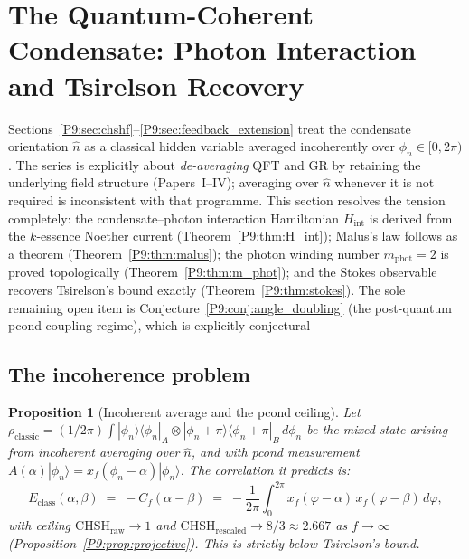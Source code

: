 \documentclass[11pt,a4paper]{article}
\newtheorem{proposition}[theorem]{Proposition}
\theoremstyle{definition}
\theoremstyle{remark}
\newcommand{\CHSH}{\mathrm{CHSH}}
\begin{document}
\section{The Quantum-Coherent Condensate: Photon Interaction and Tsirelson Recovery}
\label{P9:sec:quantum_coherent}
 
Sections~\ref{P9:sec:chshf}--\ref{P9:sec:feedback_extension} treat the condensate
orientation $\hat{n}$ as a classical hidden variable averaged incoherently
over $\phi_n\in[0,2\pi)$.
The series is explicitly about \emph{de-averaging} QFT and GR by retaining
the underlying field structure (Papers~I--IV); averaging over $\hat{n}$
whenever it is not required is inconsistent with that programme.
This section resolves the tension completely:
the condensate--photon interaction Hamiltonian $H_\mathrm{int}$ is derived from
the $k$-essence Noether current (Theorem~\ref{P9:thm:H_int});
Malus's law follows as a theorem (Theorem~\ref{P9:thm:malus});
the photon winding number $m_\mathrm{phot}=2$ is proved topologically
(Theorem~\ref{P9:thm:m_phot}); and the Stokes observable recovers
Tsirelson's bound exactly (Theorem~\ref{P9:thm:stokes}).
The sole remaining open item is Conjecture~\ref{P9:conj:angle_doubling}
(the post-quantum pcond coupling regime), which is explicitly conjectural

\subsection{The incoherence problem}
 
\begin{proposition}[Incoherent average and the pcond ceiling]
\label{P9:prop:incoherence}
Let $\rho_\mathrm{classic} = (1/2\pi)\int|\phi_n\rangle\langle\phi_n|_A\otimes|\phi_n{+}\pi\rangle\langle\phi_n{+}\pi|_B\,d\phi_n$ be the mixed state arising from incoherent averaging over $\hat{n}$, and with pcond measurement $A(\alpha)|\phi_n\rangle = x_f(\phi_n-\alpha)|\phi_n\rangle$.
The correlation it predicts is:
\begin{equation}
  E_\mathrm{class}(\alpha,\beta)
  \;=\; -C_f(\alpha-\beta)
  \;=\; -\frac{1}{2\pi}\int_0^{2\pi}
  x_f(\varphi-\alpha)\,x_f(\varphi-\beta)\,d\varphi,
  \label{P9:eq:E_class}
\end{equation}
with ceiling $\CHSH_\mathrm{raw}\to1$ and $\CHSH_\mathrm{rescaled}\to8/3\approx2.667$
as $f\to\infty$ (Proposition~\ref{P9:prop:projective}).
This is strictly below Tsirelson's bound.
\end{proposition}
 
\end{document}
